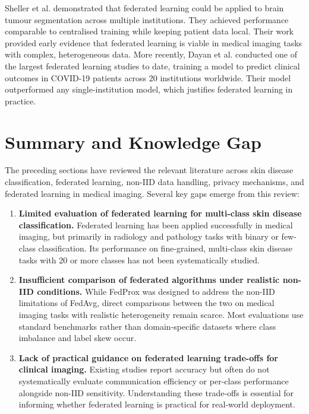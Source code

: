 \documentclass[12pt,openany,a4paper]{book}
\begin{document}
Sheller et al. \cite{shellerFederatedLearningMedicine2020} demonstrated that federated learning could be applied to brain tumour segmentation across multiple institutions. They achieved performance comparable to centralised training while keeping patient data local. Their work provided early evidence that federated learning is viable in medical imaging tasks with complex, heterogeneous data. More recently, Dayan et al. \cite{dayanFederatedLearningPredicting2021} conducted one of the largest federated learning studies to date, training a model to predict clinical outcomes in COVID-19 patients across 20 institutions worldwide. Their model outperformed any single-institution model, which justifies federated learning in practice.

\section{Summary and Knowledge Gap}
The preceding sections have reviewed the relevant literature across skin disease classification, federated learning, non-IID data handling, privacy mechanisms, and federated learning in medical imaging. Several key gaps emerge from this review:

\begin{enumerate}
  \item \textbf{Limited evaluation of federated learning for multi-class skin disease classification.} Federated learning has been applied successfully in medical imaging, but primarily in radiology and pathology tasks with binary or few-class classification. Its performance on fine-grained, multi-class skin disease tasks with 20 or more classes has not been systematically studied.
  \item \textbf{Insufficient comparison of federated algorithms under realistic non-IID conditions.} While FedProx was designed to address the non-IID limitations of FedAvg, direct comparisons between the two on medical imaging tasks with realistic heterogeneity remain scarce. Most evaluations use standard benchmarks rather than domain-specific datasets where class imbalance and label skew occur.
  \item \textbf{Lack of practical guidance on federated learning trade-offs for clinical imaging.} Existing studies report accuracy but often do not systematically evaluate communication efficiency or per-class performance alongside non-IID sensitivity. Understanding these trade-offs is essential for informing whether federated learning is practical for real-world deployment.
\end{enumerate}
\end{document}
